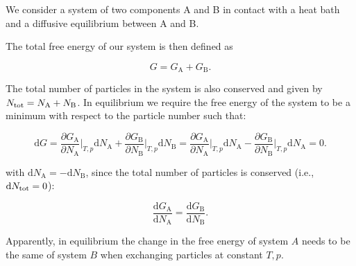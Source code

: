 \documentclass[letterpaper,10pt,english]{sphinxmanual}
\let\sphinxpxdimen\pdfpxdimen\else\newdimen\sphinxpxdimen
\begin{document}
\sphinxAtStartPar
We consider a system of two components A and B in contact with a heat bath and a diffusive equilibrium between A and B.

\noindent\sphinxincludegraphics[width=300\sphinxpxdimen,height=153\sphinxpxdimen]{{chem_pot}.png}

\sphinxAtStartPar
The total free energy of our system is then defined as

\sphinxAtStartPar
\begin{equation}
G=G_{\mathrm A}+G_{\mathrm B}.
\end{equation}

\sphinxAtStartPar
The total number of particles in the system is also conserved and given by \(N_{\rm tot}=N_{\mathrm A}+N_{\mathrm B}\). In equilibrium we require the free energy of the system to be a minimum with respect to the particle number such that:

\sphinxAtStartPar
\begin{equation}
{\mathrm d}G=\frac{ \partial G_{\mathrm A}}{\partial N_{\mathrm A}}\bigg|_{T,p}{\mathrm d}N_{\mathrm A}+\frac{\partial G_{\mathrm B}}{\partial N_{\mathrm B}}\bigg|_{T,p}{\mathrm d}N_{\mathrm B}=\frac{ \partial G_{\mathrm A}}{\partial N_{\mathrm A}}\bigg|_{T,p}{\mathrm d}N_{\mathrm A}-\frac{\partial G_{\mathrm B}}{\partial N_{\mathrm B}}\bigg|_{T,p}{\mathrm d}N_{\mathrm A}=0.
\end{equation}

\sphinxAtStartPar
with \({\mathrm d}N_{\mathrm A}=-{\mathrm d}N_{\mathrm B}\), since the total number of particles is conserved (i.e., \(\mathrm{d}N_{\rm tot}=0\)):

\sphinxAtStartPar
\begin{equation}
\frac{\mathrm dG_{\mathrm A}}{\mathrm dN_{\mathrm A}}=\frac{\mathrm dG_{\mathrm B}}{\mathrm dN_{\mathrm B}}.
\end{equation}

\sphinxAtStartPar
Apparently, in equilibrium the change in the free energy of system \(A\) needs to be the same of system \(B\) when exchanging particles at constant \(T,p\).
\end{document}
